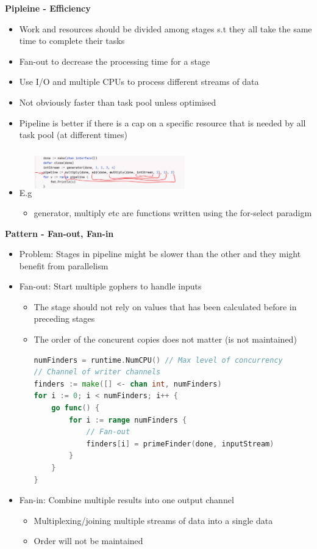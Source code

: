 \documentclass[10pt, landscape]{article}
\begin{document}
\begin{multicols}{4}
\textbf{Pipleine - Efficiency} \\
\begin{itemize}
    \item Work and resources should be divided among stages s.t they all take the same time to complete their tasks 
    \item Fan-out to decrease the processing time for a stage
    \item Use I/O and multiple CPUs to process different streams of data 
    \item Not obviously faster than task pool unless optimised 
    \item Pipeline is better if there is a cap on a specific resource that is needed by all task pool (at different times)
    \item E.g 
    \includegraphics*[width=6.5cm, height = 2cm]{pipeline.png}
    \begin{itemize}
        \item generator, multiply etc are functions written using the for-select paradigm
    \end{itemize}
\end{itemize}

\textbf{Pattern - Fan-out, Fan-in} \\
\begin{itemize}
    \item Problem: Stages in pipeline might be slower than the other and they might benefit from parallelism 
    \item Fan-out: Start multiple gophers to handle inputs
    \begin{itemize}
        \item The stage should not rely on values that has been calculated before in preceding stages 
        \item The order of the concurent copies does not matter (is not maintained)
        \begin{lstlisting}[language=Go, breaklines=true, breakatwhitespace=true]
numFinders = runtime.NumCPU() // Max level of concurrency
// Channel of writer channels
finders := make([] <- chan int, numFinders)
for i := 0; i < numFinders; i++ {
    go func() {
        for i := range numFinders {
            // Fan-out
            finders[i] = primeFinder(done, inputStream)
        }
    }
}
        \end{lstlisting}
    \end{itemize}
    \item Fan-in: Combine multiple results into one output channel
    \begin{itemize}
        \item Multiplexing/joining multiple streams of data into a single data
        \item Order will not be maintained 
    \end{itemize}
\end{itemize}


\end{multicols}
\end{document}
